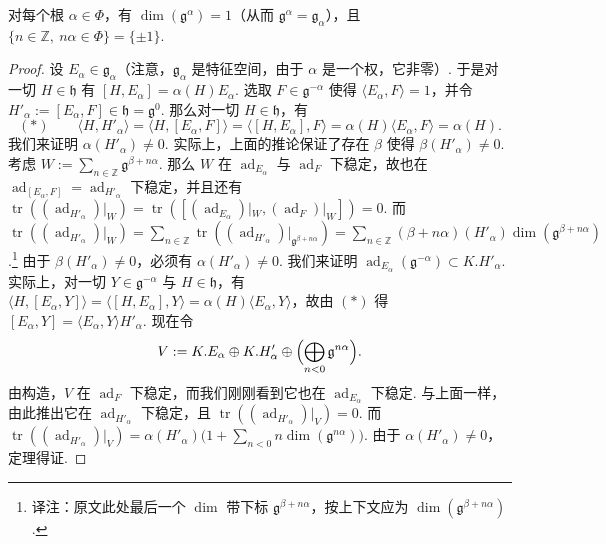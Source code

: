 \begin{proposition}\label{prop:lie-2-5-5}
对每个根 $\alpha\in\Phi$，有 $\dim(\mathfrak g^{\alpha})=1$（从而 $\mathfrak g^{\alpha}=\mathfrak g_{\alpha}$），且 $\{n\in\mathbb Z,\ n\alpha\in\Phi\}=\{\pm1\}$.
\end{proposition}
\begin{proof}
设 $E_{\alpha}\in\mathfrak g_{\alpha}$（注意，$\mathfrak g_{\alpha}$ 是特征空间，由于 $\alpha$ 是一个权，它非零）. 于是对一切 $H\in\mathfrak h$ 有 $[H,E_{\alpha}]=\alpha(H)E_{\alpha}$. 选取 $F\in\mathfrak g^{-\alpha}$ 使得 $\langle E_{\alpha},F\rangle=1$，并令 $H'_{\alpha}:=[E_{\alpha},F]\in\mathfrak h=\mathfrak g^{0}$. 那么对一切 $H\in\mathfrak h$，有
\[
(\ast)\qquad\langle H,H'_{\alpha}\rangle=\langle H,[E_{\alpha},F]\rangle=\langle[H,E_{\alpha}],F\rangle=\alpha(H)\langle E_{\alpha},F\rangle=\alpha(H).
\]
我们来证明 $\alpha(H'_{\alpha})\neq0$. 实际上，上面的推论保证了存在 $\beta$ 使得 $\beta(H'_{\alpha})\neq0$. 考虑 $W:=\sum_{n\in\mathbb Z}\mathfrak g^{\beta+n\alpha}$. 那么 $W$ 在 $\operatorname{ad}_{E_{\alpha}}$ 与 $\operatorname{ad}_{F}$ 下稳定，故也在 $\operatorname{ad}_{[E_{\alpha},F]}=\operatorname{ad}_{H'_{\alpha}}$ 下稳定，并且还有 $\operatorname{tr}((\operatorname{ad}_{H'_{\alpha}})|_{W})=\operatorname{tr}([( \operatorname{ad}_{E_{\alpha}})|_{W},(\operatorname{ad}_{F})|_{W}])=0$. 而 $\operatorname{tr}((\operatorname{ad}_{H'_{\alpha}})|_{W})=\sum_{n\in\mathbb Z}\operatorname{tr}((\operatorname{ad}_{H'_{\alpha}})|_{\mathfrak g^{\beta+n\alpha}})=\sum_{n\in\mathbb Z}(\beta+n\alpha)(H'_{\alpha})\dim(\mathfrak g^{\beta+n\alpha})$.\footnote{译注：原文此处最后一个 $\dim$ 带下标 $\mathfrak g^{\beta+n\alpha}$，按上下文应为 $\dim(\mathfrak g^{\beta+n\alpha})$.} 由于 $\beta(H'_{\alpha})\neq0$，必须有 $\alpha(H'_{\alpha})\neq0$.
我们来证明 $\operatorname{ad}_{E_{\alpha}}(\mathfrak g^{-\alpha})\subset K.H'_{\alpha}$. 实际上，对一切 $Y\in\mathfrak g^{-\alpha}$ 与 $H\in\mathfrak h$，有 $\langle H,[E_{\alpha},Y]\rangle=\langle[H,E_{\alpha}],Y\rangle=\alpha(H)\langle E_{\alpha},Y\rangle$，故由 $(\ast)$ 得 $[E_{\alpha},Y]=\langle E_{\alpha},Y\rangle H'_{\alpha}$.
现在令
\[
V:=K.E_{\alpha}\oplus K.H'_{\alpha}\oplus\Bigl(\bigoplus_{n<0}\mathfrak g^{n\alpha}\Bigr).
\]
由构造，$V$ 在 $\operatorname{ad}_{F}$ 下稳定，而我们刚刚看到它也在 $\operatorname{ad}_{E_{\alpha}}$ 下稳定. 与上面一样，由此推出它在 $\operatorname{ad}_{H'_{\alpha}}$ 下稳定，且 $\operatorname{tr}((\operatorname{ad}_{H'_{\alpha}})|_{V})=0$. 而 $\operatorname{tr}((\operatorname{ad}_{H'_{\alpha}})|_{V})=\alpha(H'_{\alpha})\bigl(1+\sum_{n<0}n\dim(\mathfrak g^{n\alpha})\bigr)$. 由于 $\alpha(H'_{\alpha})\neq0$，定理得证.
\end{proof}
